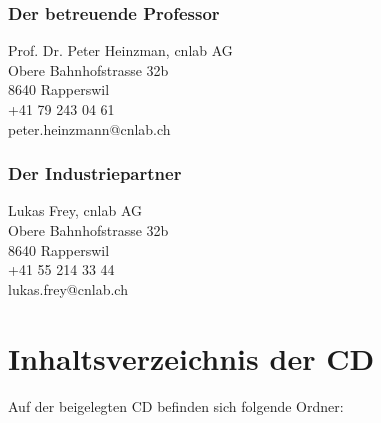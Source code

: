\subsubsection{Der betreuende Professor}
Prof. Dr. Peter Heinzman, cnlab AG\\
Obere Bahnhofstrasse 32b\\
8640 Rapperswil\\
+41 79 243 04 61\\
peter.heinzmann@cnlab.ch

\subsubsection{Der Industriepartner}
Lukas Frey, cnlab AG\\
Obere Bahnhofstrasse 32b\\
8640 Rapperswil\\
+41 55 214 33 44\\
lukas.frey@cnlab.ch

\section{Inhaltsverzeichnis der CD}
Auf der beigelegten CD befinden sich folgende Ordner:
%


